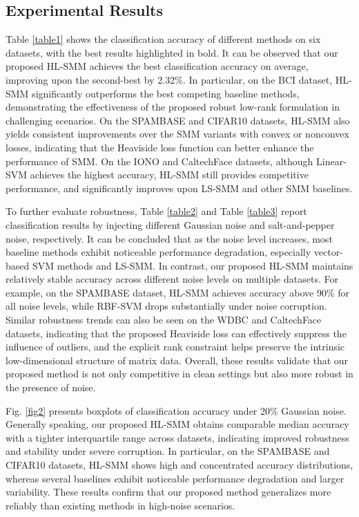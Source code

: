 \documentclass[sn-mathphys]{JORSC-jnl}%
\theoremstyle{thmstyleone}%
\theoremstyle{thmstylethree}%
\theoremstyle{thmstyleone} %
\begin{document}
\subsection{Experimental Results}

Table \ref{table1} shows the classification accuracy of different methods on six datasets, with the best results highlighted in bold. It can be observed that our proposed HL-SMM achieves the best classification accuracy on average, improving upon the second-best by 2.32\%.
In particular, on the BCI dataset, HL-SMM significantly outperforms the best competing baseline methods, demonstrating the effectiveness of the proposed robust low-rank formulation in challenging scenarios.
On the SPAMBASE and CIFAR10 datasets, HL-SMM also yields consistent improvements over the SMM variants with convex or nonconvex losses, indicating that the Heaviside loss function can better enhance the performance of SMM.
On the IONO and CaltechFace datasets, although Linear-SVM achieves the highest accuracy, HL-SMM still provides competitive performance, and significantly improves upon LS-SMM and other SMM baselines.


To further evaluate robustness, Table \ref{table2} and Table \ref{table3} report classification results by injecting different Gaussian noise and salt-and-pepper noise, respectively.
It can be concluded that as the noise level increases, most baseline methods exhibit noticeable performance degradation, especially vector-based SVM methods and LS-SMM.
In contrast, our proposed HL-SMM maintains relatively stable accuracy across different noise levels on multiple datasets.
For example, on the SPAMBASE dataset, HL-SMM achieves accuracy above 90\% for all noise levels, while RBF-SVM drops substantially under noise corruption.
Similar robustness trends can also be seen on the WDBC and CaltechFace datasets, indicating that the proposed Heaviside loss can effectively suppress the influence of outliers, and the explicit rank constraint helps preserve the intrinsic low-dimensional structure of matrix data.
Overall, these results validate that our proposed method is not only competitive in clean settings but also more robust in the presence of noise.


Fig. \ref{fig2} presents boxplots of classification accuracy under 20\% Gaussian noise.
Generally speaking, our proposed HL-SMM obtains comparable median accuracy with a tighter interquartile range across datasets, indicating improved robustness and stability under severe corruption.
In particular, on the SPAMBASE and CIFAR10 datasets, HL-SMM shows high and concentrated accuracy distributions, whereas several baselines exhibit noticeable performance degradation and larger variability.
These results confirm that our proposed method generalizes more reliably than existing methods in high-noise scenarios.
\end{document}
